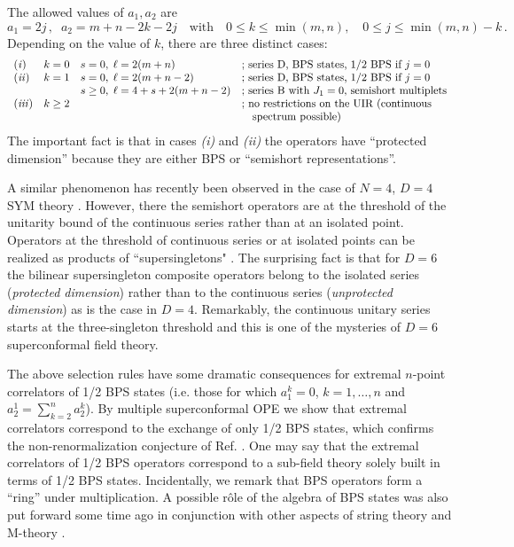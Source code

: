 \documentclass[a4paper,11pt]{article}
\begin{document}
The allowed values of $a_1,a_2$ are
$$
a_1=2j\,,\; \; a_2=m+n-2k-2j \quad\mbox{with}\quad 0 \leq k \leq
\min(m,n), \quad 0 \leq j \leq \min(m,n)-k     \,.
$$
Depending on the value of $k$, there are three distinct cases:
$$
  \begin{array}{llll}
   {\it (i)} & k=0 & s=0, \; \ell=2(m+n) &
             \mbox{;\ series D, BPS states, 1/2 BPS if $j=0$} \\
    {\it (ii)} & k=1 & s=0, \; \ell=2(m+n-2) & \mbox{;\ series D, BPS states, 1/2 BPS if
$j=0$} \\
     &  & s \geq 0, \; \ell = 4 + s +
2(m+n-2) & \mbox{;\ series B with $J_1=0$, semishort multiplets} \\
   {\it (iii)} & k \geq 2 & &\mbox{;\ no restrictions on the UIR  (continuous } \\
   & & & \mbox{\quad spectrum possible)}
  \end{array}
$$
The important fact is that in cases {\it (i)} and {\it (ii)} the operators
have ``protected dimension'' because they are either BPS or
``semishort representations''.

A similar phenomenon has recently been observed in the case of
$N=4$, $D=4$ SYM theory \cite{ES}. However, there the semishort
operators are at the threshold of the unitarity bound of the
continuous series rather than at an isolated point. Operators at
the threshold of continuous series or at isolated points can be
realized as products of ``supersingletons" \cite{FS1}. The
surprising fact is that for $D=6$ the  bilinear supersingleton
composite operators belong to the isolated series ({\it protected
dimension}) rather than to the continuous series ({\it unprotected
dimension}) as is the case in $D=4$. Remarkably, the continuous
unitary series starts at the three-singleton threshold and this is
one of the mysteries of $D=6$ superconformal field theory.

The above selection rules have some dramatic consequences for
extremal $n$-point correlators of 1/2 BPS states (i.e. those for
which $a^k_1=0$, $k=1,\ldots,n$ and $a_2^1 = \sum_{k=2}^n a_2^k$).
By multiple superconformal OPE we show that extremal correlators
correspond to the exchange of only 1/2 BPS states, which confirms
the non-renormalization conjecture of Ref. \cite{DP}. One may say
that the extremal correlators of 1/2 BPS operators correspond to a
sub-field theory solely built in terms of 1/2 BPS states.
Incidentally, we remark that BPS operators form a ``ring'' under
multiplication. A possible r\^ole of the algebra of BPS states was
also put forward some time ago in conjunction with other
aspects of string theory and M-theory \cite{MH}.
\end{document}
